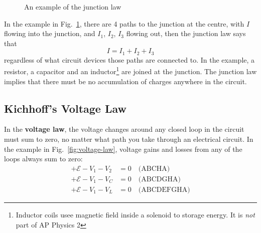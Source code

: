 \begin{figure}[ht]
  \centering
  \caption{An example of the junction law}
  \label{fig:junction-law}
\end{figure}
In the example in Fig.~\ref{fig:junction-law}, there are 4 paths to the
junction at the centre, with $I$ flowing into the junction, and $I_1$, $I_2$,
$I_3$ flowing out, then the junction law says that
\begin{equation*}
  I=I_1+I_2+I_3
\end{equation*}
regardless of what circuit devices those paths are connected to. In the
example, a resistor, a capacitor and an inductor\footnote{Inductor coils usee
magnetic field inside a solenoid to storage energy. It is \emph{not} part of
AP Physics 2} are joined at the junction. The junction law implies that there
must be no accumulation of charges anywhere in the circuit.



\subsection{Kichhoff's Voltage Law}

In the \textbf{voltage law}, the voltage changes around any closed loop in
the circuit must sum to zero, no matter what path you take through an
electrical circuit. In the example in Fig.~\ref{fig:voltage-law}, voltage gains
and losses from any of the loops always sum to zero:
\begin{align*}
  +\mathcal E-V_1-V_2 &= 0\quad\text{(ABCHA)}\\
  +\mathcal E-V_1-V_C &= 0\quad\text{(ABCDGHA)}\\
  +\mathcal E-V_1-V_L &=0\quad\text{(ABCDEFGHA)}
\end{align*}

